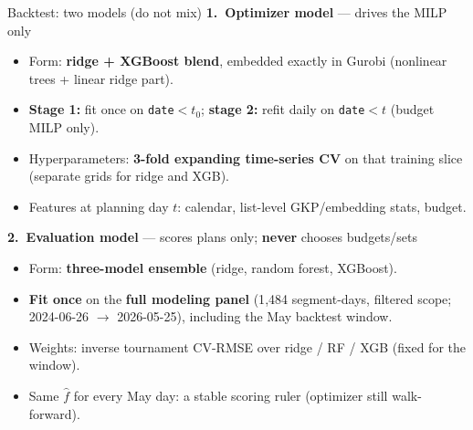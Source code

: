 \documentclass[11pt]{beamer}
\begin{document}
\begin{frame}{Backtest: two models (do not mix)}
  \textbf{1.\ Optimizer model} --- drives the MILP only
  \begin{itemize}
    \item Form: \textbf{ridge + XGBoost blend}, embedded exactly in Gurobi (nonlinear trees +
      linear ridge part).
    \item \textbf{Stage 1:} fit once on \texttt{date}${<}t_0$; \textbf{stage 2:} refit daily on \texttt{date}${<}t$ (budget MILP only).
    \item Hyperparameters: \textbf{3-fold expanding time-series CV} on that training slice
      (separate grids for ridge and XGB).
    \item Features at planning day $t$: calendar, list-level GKP/embedding stats, budget.
  \end{itemize}

  \vspace{0.35em}
  \textbf{2.\ Evaluation model} --- scores plans only; \textbf{never} chooses budgets/sets
  \begin{itemize}
    \item Form: \textbf{three-model ensemble} (ridge, random forest, XGBoost).
    \item \textbf{Fit once} on the \textbf{full modeling panel} (1{,}484 segment-days,
      filtered scope; 2024-06-26 $\rightarrow$ 2026-05-25), including the May backtest window.
    \item Weights: inverse tournament CV-RMSE over ridge / RF / XGB (fixed for the window).
    \item Same $\hat f$ for every May day: a stable scoring ruler (optimizer still walk-forward).
  \end{itemize}
\end{frame}
\end{document}
